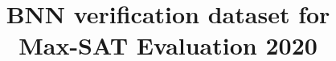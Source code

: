 \documentclass[conference]{IEEEtran}
\begin{document}
\title{BNN verification dataset for \\
Max-SAT Evaluation 2020
}

\author{
}

\maketitle
\end{document}
